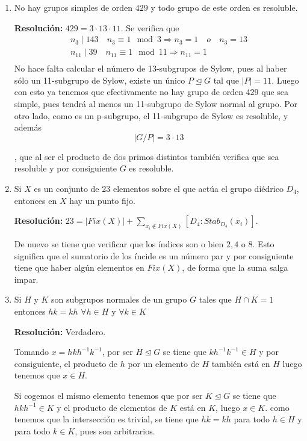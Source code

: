 \documentclass{article}
\begin{document}
\begin{enumerate}
\item No hay grupos simples de orden $429$ y todo grupo de este orden es resoluble.

\textbf{Resolución:} $429=3\cdot 13\cdot 11$. Se verifica que 
\begin{gather*}
n_3\mid 143\quad n_3\equiv 1\mod 3\Rightarrow n_3=1\quad o \quad n_3=13\\
n_{11}\mid 39 \quad n_{11}\equiv 1\mod 11\Rightarrow n_{11}=1\\
\end{gather*}
No hace falta calcular el número de 13-subgrupos de Sylow, pues al haber sólo un 11-subgrupo de Sylow, existe un único $P\unlhd G$ tal que $|P|=11$. Luego con esto ya tenemos que efectivamente no hay grupo de orden 429 que sea simple, pues tendrá al menos un 11-subgrupo de Sylow normal al grupo. Por otro lado, como es un p-subgrupo, el 11-subgrupo de Sylow es resoluble, y además
\[|G/P|=3\cdot 13\]

, que al ser el producto de dos primos distintos también verifica que sea resoluble y por consiguiente $G$ es resoluble.

\item Si $X$ es un conjunto de 23 elementos sobre el que actúa el grupo diédrico $D_4$, entonces en $X$ hay un punto fijo.

\textbf{Resolución:} $23=|Fix(X)|+\sum_{x_i\notin Fix(X)} \left[D_4:Stab_{D_4}(x_i)\right]$.

De nuevo se tiene que verificar que los índices son o bien $2,4$ o $8$. Esto significa que el sumatorio de los íncide es un número par y por consiguiente tiene que haber algún elementos en $Fix(X)$, de forma que la suma salga impar.

\item Si $H$ y $K$ son subgrupos normales de un grupo $G$ tales que $H\cap K=1$ entonces $hk=kh$ $\forall h\in H$ y $\forall k\in K$

\textbf{Resolución:} Verdadero. 

Tomando $x=hkh^{-1}k^{-1}$, por ser $H\unlhd G$ se tiene que $kh^{-1}k^{-1}\in H$ y por consiguiente, el producto de $h$ por un elemento de $H$ también está en $H$ luego tenemos que $x\in H$. 

Si cogemos el mismo elemento tenemos que por ser $K\unlhd G$ se tiene que $hkh^{-1}\in K$ y el producto de elementos de $K$ está en $K$, luego $x\in K$. como tenemos que la intersección es trivial, se tiene que $hk=kh$ para todo $h\in H$ y para todo $k\in K$, pues son arbitrarios.
\end{enumerate}
\end{document}
